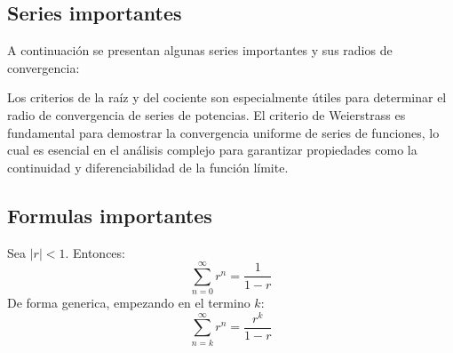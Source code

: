 \subsection{Series importantes}

A continuación se presentan algunas series importantes y sus radios de convergencia:


\begin{observación}
Los criterios de la raíz y del cociente son especialmente útiles para determinar el radio de convergencia de series de potencias. El criterio de Weierstrass es fundamental para demostrar la convergencia uniforme de series de funciones, lo cual es esencial en el análisis complejo para garantizar propiedades como la continuidad y diferenciabilidad de la función límite.
\end{observación}

\subsection{Formulas importantes}

\begin{teorema}
    Sea $|r| < 1$. Entonces:
    \[
    \sum_{n=0}^\infty r^n = \frac{1}{1-r}
    \]
    De forma generica, empezando en el termino $k$:
    \[
    \sum_{n=k}^\infty r^n = \frac{r^k}{1-r}
    \]
\end{teorema}